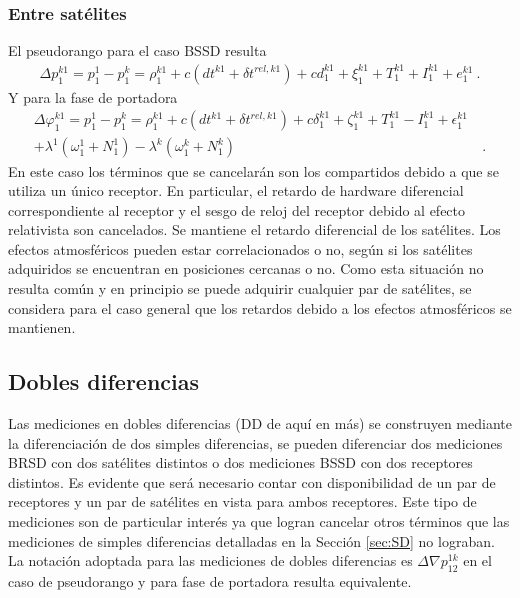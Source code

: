 \documentclass[a4paper,12pt,oneside,onecolumn,final,openright]{book}%
\begin{document}
\subsubsection{Entre satélites}
	El pseudorango para el caso BSSD resulta
\begin{align}\label{BSSD_pr}
	\Delta p_1^{k1} = p_1^1 - p_1^k = \rho_1^{k1} + c\left( dt^{k1} + \delta t^{rel,k1} \right) + cd_1^{k1} + \xi_1^{k1} + T_1^{k1} + I_1^{k1} + e_1^{k1} \ .
\end{align}
	Y para la fase de portadora 
\begin{align}\label{BSSD_fdp}
	\Delta \varphi_1^{k1} = p_1^1 - p_1^k = \rho_1^{k1} + c\left( dt^{k1} + \delta t^{rel,k1} \right) + c\delta_1^{k1} + \zeta_1^{k1} + T_1^{k1} - I_1^{k1} + \epsilon_1^{k1} &\\
	+ \lambda^1\left( \omega_1^1 + N_1^1 \right) - \lambda^k\left( \omega_1^k + N_1^k \right)& \ . \nonumber
\end{align}
	En este caso los términos que se cancelarán son los compartidos debido a que se utiliza un único receptor. En particular, el retardo de hardware diferencial correspondiente al receptor y el sesgo de reloj del receptor debido al efecto relativista son cancelados. Se mantiene el retardo diferencial de los satélites. Los efectos atmosféricos pueden estar correlacionados o no, según si los satélites adquiridos se encuentran en posiciones cercanas o no. Como esta situación no resulta común y en principio se puede adquirir cualquier par de satélites, se considera para el caso general que los retardos debido a los efectos atmosféricos se mantienen.
\subsection{Dobles diferencias}
	Las mediciones en dobles diferencias (DD de aquí en más) se construyen mediante la diferenciación de dos simples diferencias, se pueden diferenciar dos mediciones BRSD con dos satélites distintos o dos mediciones BSSD con dos receptores distintos. Es evidente que será necesario contar con disponibilidad de un par de receptores y un par de satélites en vista para ambos receptores. Este tipo de mediciones son de particular interés ya que logran cancelar otros términos que las mediciones de simples diferencias detalladas en la Sección \ref{sec:SD} no lograban. La notación adoptada para las mediciones de dobles diferencias es $\Delta \nabla p_{12}^{1k}$ en el caso de pseudorango y para fase de portadora resulta equivalente. 
	
\end{document}
